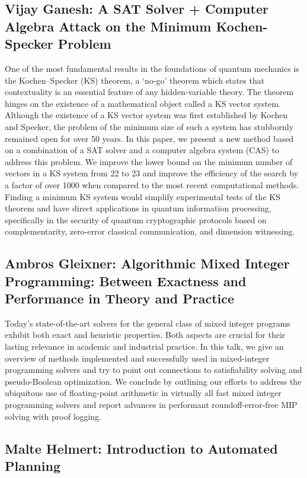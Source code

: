 \documentclass[11pt]{article}
\begin{document}
\subsection*{Vijay Ganesh: A SAT Solver + Computer Algebra Attack on the Minimum Kochen-Specker Problem}\label{Ganesh}

One of the most fundamental results in the foundations of quantum mechanics is the Kochen--Specker (KS) theorem, a `no-go' theorem which states that contextuality is an essential feature of any hidden-variable theory. The theorem hinges on the existence of a mathematical object called a KS vector system. Although the existence of a KS vector system was first established by Kochen and Specker, the problem of the minimum size of such a system has stubbornly remained open for over 50 years. In this paper, we present a new method based on a combination of a SAT solver and a computer algebra system (CAS) to address this problem. We improve the lower bound on the minimum number of vectors in a KS system from 22 to 23 and improve the efficiency of the search by a factor of over 1000 when compared to the most recent computational methods.  Finding a minimum KS system would simplify experimental tests of the KS theorem and have direct applications in quantum information processing, specifically in the security of quantum cryptographic protocols based on complementarity, zero-error classical communication, and dimension witnessing.



\subsection*{Ambros Gleixner: Algorithmic Mixed Integer Programming: Between Exactness and Performance in Theory and Practice}\label{Gleixner}

Today's state-of-the-art solvers for the general class of mixed integer programs exhibit both exact and heuristic properties. Both aspects are crucial for their lasting relevance in academic and industrial practice.  In this talk, we give an overview of methods implemented and successfully used in mixed-integer programming solvers and try to point out connections to satisfiability solving and pseudo-Boolean optimization.  We conclude by outlining our efforts to address the ubiquitous use of floating-point arithmetic in virtually all fast mixed integer programming solvers and report advances in performant roundoff-error-free MIP solving with proof logging.


\subsection*{Malte Helmert: Introduction to Automated Planning}\label{Helmert}
\end{document}
